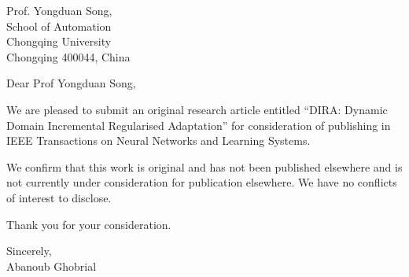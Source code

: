 \documentclass[11pt, a4paper]{letter} %
\begin{document}

\begin{letter}{
	Prof. Yongduan Song,\\
	School of Automation\\
	Chongqing University\\
	Chongqing 400044, China\\
}


\opening{Dear Prof Yongduan Song,}

\noindent We are pleased to submit an original research article entitled “DIRA: Dynamic Domain Incremental Regularised Adaptation” for consideration of publishing in IEEE Transactions on Neural Networks and Learning Systems. 

\noindent We confirm that this work is original and has not been published elsewhere and is not currently under consideration for publication elsewhere. We have no conflicts of interest to disclose. 

\noindent Thank you for your consideration. 

\noindent Sincerely,\\


\noindent Abanoub Ghobrial





\end{letter}
\end{document}
